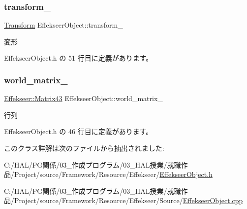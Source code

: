 \subsubsection{\texorpdfstring{transform\+\_\+}{transform\_}}
{\footnotesize\ttfamily \mbox{\hyperlink{class_transform}{Transform}} Effekseer\+Object\+::transform\+\_\+\hspace{0.3cm}{\ttfamily [private]}}



変形 



 Effekseer\+Object.\+h の 51 行目に定義があります。

\mbox{\label{class_effekseer_object_a16171d7157607b9d6a5fc0aa4ad9d454}} 
\subsubsection{\texorpdfstring{world\+\_\+matrix\+\_\+}{world\_matrix\_}}
{\footnotesize\ttfamily \mbox{\hyperlink{struct_effekseer_1_1_matrix43}{Effekseer\+::\+Matrix43}} Effekseer\+Object\+::world\+\_\+matrix\+\_\+\hspace{0.3cm}{\ttfamily [private]}}



行列 



 Effekseer\+Object.\+h の 46 行目に定義があります。



このクラス詳解は次のファイルから抽出されました\+:\begin{DoxyCompactItemize}
\item 
C\+:/\+H\+A\+L/\+P\+G関係/03\+\_\+作成プログラム/03\+\_\+\+H\+A\+L授業/就職作品/\+Project/source/\+Framework/\+Resource/\+Effekseer/\mbox{\hyperlink{_effekseer_object_8h}{Effekseer\+Object.\+h}}\item 
C\+:/\+H\+A\+L/\+P\+G関係/03\+\_\+作成プログラム/03\+\_\+\+H\+A\+L授業/就職作品/\+Project/source/\+Framework/\+Resource/\+Effekseer/\+Source/\mbox{\hyperlink{_effekseer_object_8cpp}{Effekseer\+Object.\+cpp}}\end{DoxyCompactItemize}
